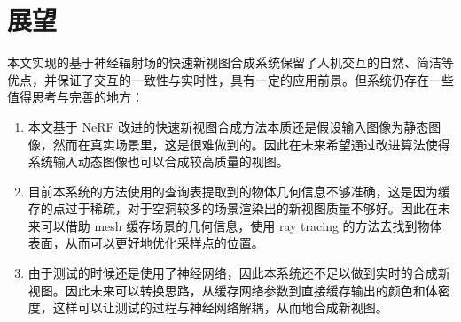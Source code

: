 \section{展望}
本文实现的基于神经辐射场的快速新视图合成系统保留了人机交互的自然、简洁等优点，并保证了交互的一致性与实时性，具有一定的应用前景。但系统仍存在一些值得思考与完善的地方：
\begin{enumerate}
	\item 本文基于 NeRF 改进的快速新视图合成方法本质还是假设输入图像为静态图像，然而在真实场景里，这是很难做到的。因此在未来希望通过改进算法使得系统输入动态图像也可以合成较高质量的视图。
	\item 目前本系统的方法使用的查询表提取到的物体几何信息不够准确，这是因为缓存的点过于稀疏，对于空洞较多的场景渲染出的新视图质量不够好。因此在未来可以借助 mesh 缓存场景的几何信息，使用 ray tracing 的方法去找到物体表面，从而可以更好地优化采样点的位置。
	\item 由于测试的时候还是使用了神经网络，因此本系统还不足以做到实时的合成新视图。因此未来可以转换思路，从缓存网络参数到直接缓存输出的颜色和体密度，这样可以让测试的过程与神经网络解耦，从而地合成新视图。
\end{enumerate}

















